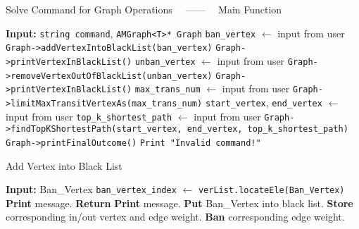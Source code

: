 \begin{algorithm}
    \caption{Solve Command for Graph Operations \ \ —— \ \ Main Function}
    \begin{algorithmic}[1]
    \State \textbf{Input:} \texttt{string command}, \texttt{AMGraph<T>* Graph}
        \State \quad \texttt{ban\_vertex} $\gets$ input from user
        \State \quad \texttt{Graph->addVertexIntoBlackList(ban\_vertex)}
        \State \quad \texttt{Graph->printVertexInBlackList()}
    \Else
            \State \quad \texttt{unban\_vertex} $\gets$ input from user
            \State \quad \texttt{Graph->removeVertexOutOfBlackList(unban\_vertex)}
            \State \quad \texttt{Graph->printVertexInBlackList()}
        \Else
                \State \quad \texttt{max\_trans\_num} $\gets$ input from user
                \State \quad \texttt{Graph->limitMaxTransitVertexAs(max\_trans\_num)}
            \Else
                    \State \quad \texttt{start\_vertex}, \texttt{end\_vertex} $\gets$ input from user
                    \State \quad \texttt{top\_k\_shortest\_path} $\gets$ input from user
                    \State \quad \texttt{Graph->findTopKShortestPath(start\_vertex, end\_vertex, top\_k\_shortest\_path)}
                    \State \quad \texttt{Graph->printFinalOutcome()}
                \Else
                    \State \quad \texttt{Print "Invalid command!"}
                \EndIf
            \EndIf
        \EndIf
    \EndIf
    \end{algorithmic}
\end{algorithm}

\begin{algorithm}
    \caption{Add Vertex into Black List}
    \begin{algorithmic}[1]
    \State \textbf{Input:} Ban\_Vertex
    \State \quad \texttt{ban\_vertex\_index} $\gets$ \texttt{verList.locateEle(Ban\_Vertex)}
        \State \textbf{Print} message.
        \State \textbf{Return}
    \Else
        \State \textbf{Print} message.
        \State \textbf{Put} Ban\_Vertex into black list.
        \State \textbf{Store} corresponding in/out vertex and edge weight.
        \State \textbf{Ban} corresponding edge weight.
    \EndIf
    \end{algorithmic}
\end{algorithm}

